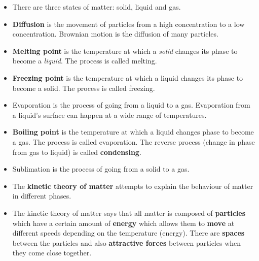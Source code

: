       
\label{m38730*cid7}
            \nopagebreak
\label{m38730*id311034}\begin{itemize}[noitemsep]
\label{m38730*id973}\item There are three states of matter: solid, liquid and gas.
\label{m38730*id872}\item \textbf{Diffusion} is the movement of particles from a high concentration to a low concentration. Brownian motion is the diffusion of many particles.
\label{m38730*uid83}\item \textbf{Melting point} is the temperature at which a \textsl{solid} changes its phase to become a \textsl{liquid}. The process is called melting.
\item \textbf{Freezing point} is the temperature at which a liquid changes its phase to become a solid. The process is called freezing.
\item Evaporation is the process of going from a liquid to a gas. Evaporation from a liquid’s surface can happen at a wide range of temperatures.
\label{m38730*uid84}\item \textbf{Boiling point} is the temperature at which a liquid changes phase to become a gas. The process is called evaporation. The reverse process (change in phase from gas to liquid) is called \textbf{condensing}.
\item Sublimation is the process of going from a solid to a gas. 
\item The \textbf{kinetic theory of matter} attempts to explain the behaviour of matter in different phases.
\label{m38730*uid81}\item The kinetic theory of matter says that all matter is composed of \textbf{particles} which have a certain amount of \textbf{energy} which allows them to \textbf{move} at different speeds depending on the temperature (energy). There are \textbf{spaces} between the particles and also \textbf{attractive forces} between particles when they come close together.
\end{itemize}
\label{m38730*cid9}
\vspace{1cm}
